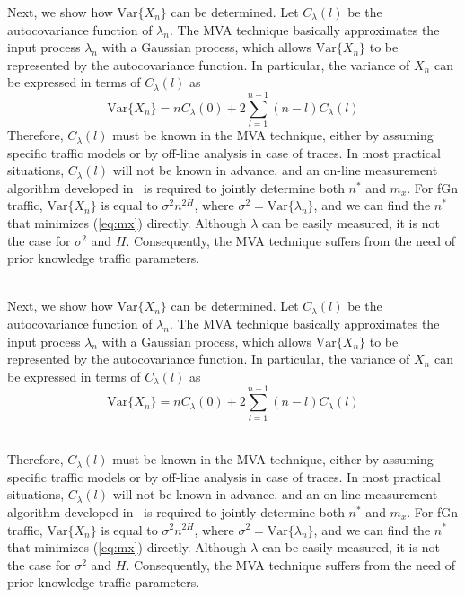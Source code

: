 \documentclass[12pt,oneside,openright,a4paper]{cpe-thai-project}
\begin{document}
Next, we show how $\mathrm{Var}\{X_n\}$ can be determined.  Let
$C_{\lambda}(l)$ be the autocovariance function of $\lambda_n$.  The
MVA technique basically approximates the input process $\lambda_n$
with a Gaussian process, which allows $\mathrm{Var}\{X_n\}$ to be
represented by the autocovariance function.  In particular, the
variance of $X_n$ can be expressed in terms of $C_{\lambda}(l)$ as
\begin{equation}
  \mathrm{Var}\{X_n\} = nC_{\lambda}(0) + 2\sum_{l=1}^{n-1} (n-l)C_{\lambda}(l)
\end{equation} 
Therefore, $C_{\lambda}(l)$ must be known in the MVA technique, either
by assuming specific traffic models or by off-line analysis in case of
traces.  In most practical situations, $C_{\lambda}(l)$ will not be
known in advance, and an on-line measurement algorithm developed
in~\cite{eun01} is required to jointly determine both $n^\ast$ and
$m_x$. For fGn traffic, $\mathrm{Var}\{X_n\}$ is equal to $\sigma^2
n^{2H}$, where $\sigma^2 = \mathrm{Var}\{\lambda_n\}$, and we can find
the $n^\ast$ that minimizes (\ref{eq:mx}) directly. Although $\lambda$
can be easily measured, it is not the case for $\sigma^2$ and $H$.
Consequently, the MVA technique suffers from the need of prior
knowledge traffic parameters.


 \\

Next, we show how $\mathrm{Var}\{X_n\}$ can be determined.  Let
$C_{\lambda}(l)$ be the autocovariance function of $\lambda_n$.  The
MVA technique basically approximates the input process $\lambda_n$
with a Gaussian process, which allows $\mathrm{Var}\{X_n\}$ to be
represented by the autocovariance function.  In particular, the
variance of $X_n$ can be expressed in terms of $C_{\lambda}(l)$ as
\begin{equation}
  \mathrm{Var}\{X_n\} = nC_{\lambda}(0) + 2\sum_{l=1}^{n-1} (n-l)C_{\lambda}(l)
\end{equation} 

 \\

Therefore, $C_{\lambda}(l)$ must be known in the MVA technique, either
by assuming specific traffic models or by off-line analysis in case of
traces.  In most practical situations, $C_{\lambda}(l)$ will not be
known in advance, and an on-line measurement algorithm developed
in~\cite{eun01} is required to jointly determine both $n^\ast$ and
$m_x$. For fGn traffic, $\mathrm{Var}\{X_n\}$ is equal to $\sigma^2
n^{2H}$, where $\sigma^2 = \mathrm{Var}\{\lambda_n\}$, and we can find
the $n^\ast$ that minimizes (\ref{eq:mx}) directly. Although $\lambda$
can be easily measured, it is not the case for $\sigma^2$ and $H$.
Consequently, the MVA technique suffers from the need of prior
knowledge traffic parameters. 
\end{document}
